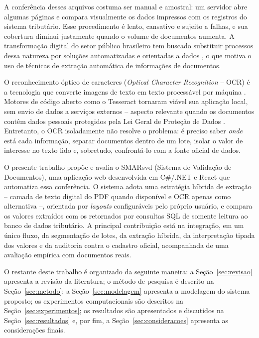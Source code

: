 \documentclass[article,12pt,oneside,a4paper,english,brazil]{abntex2}
\begin{document}
A conferência desses arquivos costuma ser manual e amostral: um servidor abre algumas
páginas e compara visualmente os dados impressos com os registros do sistema
tributário. Esse procedimento é lento, cansativo e sujeito a falhas, e sua cobertura
diminui justamente quando o volume de documentos aumenta. A transformação digital do
setor público brasileiro tem buscado substituir processos dessa natureza por soluções
automatizadas e orientadas a dados \cite{oecd2018}, o que motiva o uso de técnicas de
extração automática de informações de documentos.

O reconhecimento óptico de caracteres (\textit{Optical Character Recognition} -- OCR) é a
tecnologia que converte imagens de texto em texto processável por máquina
\cite{islam2017,memon2020}. Motores de código aberto como o Tesseract
\cite{smith2007} tornaram viável sua aplicação local, sem envio de dados a serviços
externos -- aspecto relevante quando os documentos contêm dados pessoais protegidos pela
Lei Geral de Proteção de Dados \cite{brasil2018lgpd}. Entretanto, o OCR isoladamente
não resolve o problema: é preciso saber \emph{onde} está cada informação, separar
documentos dentro de um lote, isolar o valor de interesse no texto lido e, sobretudo,
confrontá-lo com a fonte oficial de dados.

O presente trabalho propõe e avalia o SMARsvd (Sistema de Validação de Documentos), uma
aplicação web desenvolvida em C\#/.NET e React que automatiza essa conferência. O
sistema adota uma estratégia híbrida de extração -- camada de texto digital do PDF
quando disponível e OCR apenas como alternativa --, orientada por \textit{layouts}
configuráveis pelo próprio usuário, e compara os valores extraídos com os retornados
por consultas SQL de somente leitura ao banco de dados tributário. A principal
contribuição está na integração, em um único fluxo, da segmentação de lotes, da
extração híbrida, da interpretação tipada dos valores e da auditoria contra o cadastro
oficial, acompanhada de uma avaliação empírica com documentos reais.

O restante deste trabalho é organizado da seguinte maneira: a Seção~\ref{sec:revisao}
apresenta a revisão da literatura; o método de pesquisa é descrito na
Seção~\ref{sec:metodo}; a Seção~\ref{sec:modelagem} apresenta a modelagem do sistema
proposto; os experimentos computacionais são descritos na
Seção~\ref{sec:experimentos}; os resultados são apresentados e discutidos na
Seção~\ref{sec:resultados} e, por fim, a Seção~\ref{sec:consideracoes} apresenta as
considerações finais.
\end{document}
